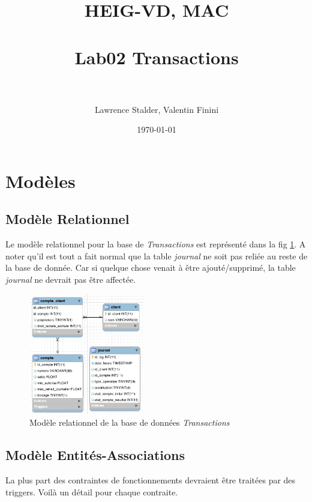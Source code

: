 \documentclass[paper=a4, fontsize=11pt]{scrartcl} %
\title{	
\normalfont \normalsize 
\textsc{HEIG-VD, MAC} \\ [25pt] %
\horrule{0.5pt} \\[0.4cm] %
\huge Lab02 Transactions \\ %
\horrule{2pt} \\[0.5cm] %
}
\author{Lawrence Stalder, Valentin Finini} %
\date{\normalsize\today} %
\numberwithin{equation}{section} %
\numberwithin{figure}{section} %
\numberwithin{table}{section} %
\begin{document}
\maketitle %


\section{Modèles}

\subsection{Modèle Relationnel}

Le modèle relationnel pour la base de \textit{Transactions} est représenté dans la fig \ref{fig:rela}. A noter qu'il est tout a fait normal que la table \textit{journal} ne soit pas reliée au reste de la base de donnée. Car si quelque chose venait à être ajouté/supprimé, la table \textit{journal} ne devrait pas être affectée.

\begin{figure}[h]
  \centering
  \includegraphics[height=200px]{relationnel.png}
  \caption{Modèle relationnel de la base de données \textit{Transactions}}
  \label{fig:rela}
\end{figure}


\subsection{Modèle Entités-Associations}

La plus part des contraintes de fonctionnements devraient être traitées par des triggers. Voilà un détail pour chaque contraite.
\end{document}
